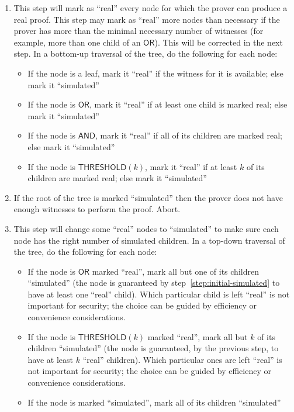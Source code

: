 \documentclass[11pt]{article}
\newcommand{\andnode}{\ensuremath{\mathsf{AND}}}
\newcommand{\ornode}{\ensuremath{\mathsf{OR}}}
\newcommand{\tnode}{\ensuremath{\mathsf{THRESHOLD}}}
\begin{document}
\begin{enumerate}
    \item \label{step:initial-simulated} This step will mark as ``real'' every node for which the prover can produce a real proof. This step may mark as ``real'' more nodes than necessary if the prover has more than the minimal necessary number of witnesses (for example, more than one child of an $\ornode$).  This will be corrected in the next step. In a bottom-up traversal of the tree, do the following for each node:
        \begin{itemize}
            \item If the node is a leaf, mark it ``real'' if the witness for it is available; else mark it ``simulated''
            \item If the node is $\ornode$, mark it ``real'' if at least one child is marked real; else mark it ``simulated''
            \item If the node is $\andnode$, mark it ``real'' if all of its children are marked real; else mark it ``simulated''
            \item If the node is $\tnode(k)$, mark it ``real'' if at least $k$ of its children are marked real; else mark it ``simulated''
        \end{itemize}
    
    \item If the root of the tree is marked ``simulated'' then the prover does not have enough witnesses to perform the proof. Abort.
    
    \item This step will change some ``real'' nodes to ``simulated'' to make sure each node has the right number of simulated children.
          In a top-down traversal of the tree, do the following for each node:
        \begin{itemize}
            \item
            If the node is $\ornode$ marked ``real'',  mark all but one of its children ``simulated''
            (the node is guaranteed by step~\ref{step:initial-simulated} to have at least one ``real'' child).
            Which particular child is left ``real'' is not important for security; the choice can be guided by efficiency or convenience considerations.
            \item
            If  the node is $\tnode(k)$ marked ``real'', mark all but $k$ of its children ``simulated''
            (the node is guaranteed, by the previous step, to have at least $k$ ``real'' children).
            Which particular ones are left ``real'' is not important for security; the choice can be guided by efficiency or convenience considerations.
            \item
            If the node is marked ``simulated'', mark all of its children ``simulated''
        \end{itemize}
\end{enumerate}
\end{document}
